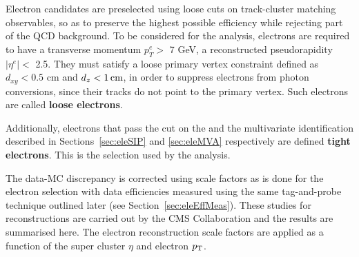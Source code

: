 Electron candidates are preselected using loose cuts on track-cluster matching observables, so as to preserve the highest possible efficiency while rejecting part of the QCD background. To be considered for the analysis, electrons are required to have a
transverse momentum $p^e_T >$ 7 GeV,
a reconstructed pseudorapidity $|\eta^e| <$ 2.5.
They must satisfy a loose primary vertex
constraint defined as $d_{xy} < 0.5$ cm and $d_z < 1\,\text{cm}$,
in order to suppress electrons from photon conversions, since their tracks do not point to the primary vertex.
Such electrons are called {\bf loose electrons}.

Additionally,
electrons that pass the cut on the \SIPthreeD and the multivariate identification described in
Sections~\ref{sec:eleSIP} and \ref{sec:eleMVA} respectively
are defined {\bf tight electrons}.
This is the selection used by the analysis.

The data-MC discrepancy is corrected using scale factors as is done for the electron selection with data efficiencies measured using the same tag-and-probe technique outlined later (see Section~\ref{sec:eleEffMeas}).
These studies for reconstructions are carried out by the CMS Collaboration and the results are summarised here.
The electron reconstruction scale factors
are applied as a function of the super cluster $\eta$ and electron $p_{\mathrm{T}}$.
